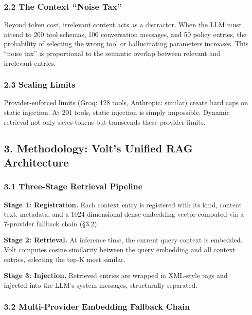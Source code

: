 \documentclass[
  10pt,
]{article}
\begin{document}
\subsubsection{2.2 The Context ``Noise
Tax''}\label{the-context-noise-tax}

Beyond token cost, irrelevant context acts as a distractor. When the LLM
must attend to 200 tool schemas, 100 conversation messages, and 50
policy entries, the probability of selecting the wrong tool or
hallucinating parameters increases. This ``noise tax'' is proportional
to the semantic overlap between relevant and irrelevant entries.

\subsubsection{2.3 Scaling Limits}\label{scaling-limits}

Provider-enforced limits (Groq: 128 tools, Anthropic: similar) create
hard caps on static injection. At 201 tools, static injection is simply
impossible. Dynamic retrieval not only saves tokens but transcends these
provider limits.

\subsection{3. Methodology: Volt's Unified RAG
Architecture}\label{methodology-volts-unified-rag-architecture}

\subsubsection{3.1 Three-Stage Retrieval
Pipeline}\label{three-stage-retrieval-pipeline}

\textbf{Stage 1: Registration.} Each context entry is registered with
its kind, content text, metadata, and a 1024-dimensional dense embedding
vector computed via a 7-provider fallback chain (§3.2).

\textbf{Stage 2: Retrieval.} At inference time, the current query
context is embedded. Volt computes cosine similarity between the query
embedding and all context entries, selecting the top-K most similar.

\textbf{Stage 3: Injection.} Retrieved entries are wrapped in XML-style
tags and injected into the LLM's system messages, structurally
separated.

\subsubsection{3.2 Multi-Provider Embedding Fallback
Chain}\label{multi-provider-embedding-fallback-chain}
\end{document}
